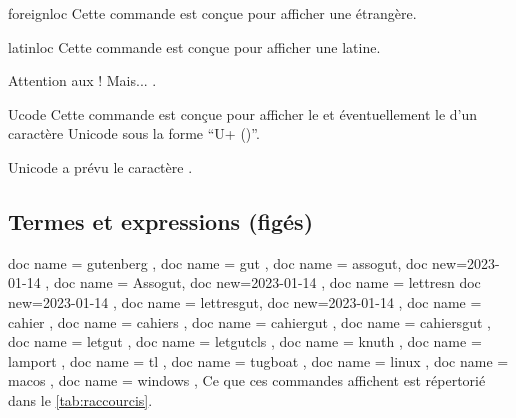 \documentclass{letgut}
\begin{document}
\begin{docCommand}{foreignloc}{}
  Cette commande est conçue pour afficher une  étrangère.
\end{docCommand}

\begin{docCommand}{latinloc}{}
  Cette commande est conçue pour afficher une  latine.
\end{docCommand}

\begin{ltx-code-result}[title addon=locutions étrangères,listing options app={deletekeywords={[3]{options}}}]
Attention aux  !
Mais... .
\end{ltx-code-result}

\begin{docCommand}{Ucode}{}
  Cette commande est conçue pour afficher le  et
  éventuellement le  d'un caractère Unicode sous la forme
  \enquote{U+ ()}.
\end{docCommand}

\begin{ltx-code-result}[title addon=Point de code d'un caractère Unicode,listing options app={deletekeywords={[3]{options}}}]
Unicode a prévu le caractère .
\end{ltx-code-result}

\subsection{Termes et expressions (figés)}
\label{sec:termes}

\begin{docCommands}
  {
    { doc name = gutenberg },
    { doc name = gut },
    { doc name = assogut, doc new={2023-01-14} },
    { doc name = Assogut, doc new={2023-01-14} },
    { doc name = lettresn doc new={2023-01-14} },
    { doc name = lettresgut, doc new={2023-01-14} },
    { doc name = cahier },
    { doc name = cahiers },
    { doc name = cahiergut },
    { doc name = cahiersgut },
    { doc name = letgut },
    { doc name = letgutcls },
    { doc name = knuth },
    { doc name = lamport },
    { doc name = tl },
    { doc name = tugboat },
    { doc name = linux },
    { doc name = macos },
    { doc name = windows },
  }
  Ce que ces commandes affichent est répertorié dans le \vref{tab:raccourcis}.
\end{docCommands}
\end{document}
